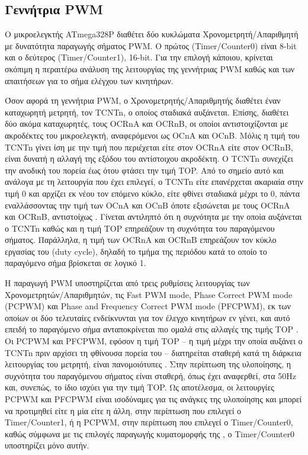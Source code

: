 \subsection{Γεννήτρια PWM}

Ο μικροελεγκτής ATmega328P διαθέτει δύο κυκλώματα Χρονομετρητή\slash Απαριθμητή
με δυνατότητα παραγωγής σήματος PWM. Ο πρώτος (Timer\slash Counter0) είναι 8-bit
και ο δεύτερος (Timer\slash Counter1), 16-bit. Για την επιλογή κάποιου, κρίνεται
σκόπιμη η περαιτέρω ανάλυση της λειτουργίας της γεννήτριας PWM καθώς και των
απαιτήσεων για το σήμα ελέγχου των κινητήρων.

Όσον αφορά τη γεννήτρια PWM, ο Χρονομετρητής\slash Απαριθμητής διαθέτει έναν
καταχωρητή μετρητή, τον TCNTn, ο οποίος σταδιακά αυξάνεται. Επίσης, διαθέτει
δύο ακόμα καταχωρητές, τους OCRnA και OCRnB, οι οποίοι αντιστοιχίζονται με
ακροδέκτες του μικροελεγκτή, αναφερόμενοι ως OCnA και OCnB. Μόλις η τιμή του
TCNTn γίνει ίση με την τιμή που περιέχεται είτε στον OCRnA είτε στον OCRnB,
είναι δυνατή η αλλαγή της εξόδου του αντίστοιχου ακροδέκτη. Ο TCNTn συνεχίζει
την ανοδική του πορεία έως ότου φτάσει την τιμή TOP. Από το σημείο αυτό και
ανάλογα με τη λειτουργία που έχει επιλεγεί, ο TCNTn είτε επανέρχεται ακαριαία
στην τιμή 0 και αρχίζει εκ νέου τον επόμενο κύκλο, είτε φθίνει σταδιακά μέχρι το
0, πάντα εναλλάσσοντας την τιμή των OCnA και OCnB όποτε εξισώνεται με τους OCRnA
και OCRnB, αντιστοίχως \parencite[100--102,124--129]{atmel13}.
Γίνεται αντιληπτό ότι η συχνότητα με την οποία αυξάνεται ο TCNTn καθώς και η
τιμή TOP επηρεάζουν τη συχνότητα του παραγόμενου σήματος. Παράλληλα, η τιμή των
OCRnA και OCRnB επηρεάζουν τον κύκλο εργασίας του (\textenglish{duty cycle}),
δηλαδή το τμήμα της περιόδου κατά το οποίο το παραγόμενο σήμα βρίσκεται σε
λογικό 1.

Η παραγωγή PWM υποστηρίζεται από τρεις ρυθμίσεις λειτουργίας των
Χρονομετρητών\slash Απαριθμητών, τις \textenglish{Fast PWM mode, Phase Correct
PWM mode (PCPWM)} και \textenglish{Phase and Frequency Correct PWM mode
(PFCPWM)}, εκ των οποίων οι δύο τελευταίες ενδείκνυνται για τον έλεγχο κινητήρων
εν γένει, και αυτό επειδή το παραγόμενο σήμα ανταποκρίνεται πιο ομαλά στις
αλλαγές της τιμής TOP \parencite[126,128]{atmel13}. Οι PCPWM και PFCPWM, εφόσον
η τιμή TOP -- η τιμή μέχρι την οποία αυξάνει ο TCNTn πριν αρχίσει τη φθίνουσα
πορεία του -- διατηρείται σταθερή κατά τη διάρκεια λειτουργίας του μετρητή,
είναι πανομοιότυπες \parencite[127]{atmel13}. Στην περίπτωση της υλοποίησης, η
συχνότητα του παραγόμενου σήματος είναι σταθερή, όπως έχει αναφερθεί, στα 50Hz
και, συνεπώς, το ίδιο ισχύει για την τιμή TOP. Ως αποτέλεσμα, οι λειτουργίες
PCPWM και PFCPWM είναι ισοδύναμες για τις ανάγκες της υλοποίησης και μπορεί να
προτιμηθεί είτε η μία είτε η άλλη, στην περίπτωση που επιλεγεί ο
\textenglish{Timer\slash Counter1}, ή η PCPWM, στην περίπτωση που επιλεγεί ο
\textenglish{Timer\slash Counter0}, καθώς σύμφωνα με τις επιλογές παραγωγής
κυματομορφής της \textcite[107]{atmel13}, ο \textenglish{Timer\slash Counter0}
υποστηρίζει μόνο αυτήν.


